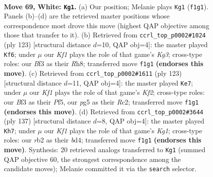 \documentclass[11pt]{article}
\begin{document}
\clearpage

\begin{figure}[p]\centering
\begin{subfigure}{0.46\textwidth}\centering
\resizebox{\linewidth}{!}{%
\newchessgame
\chessboard[
  setfen={8/8/4k3/4p1p1/5p2/5B2/1r6/5K2 w - - 49 69},
  showmover=false,
  pgfstyle=straightmove, color=movearrow, markmove={f1-g1}
]}
\caption{}
\end{subfigure}\hfill
\begin{subfigure}{0.46\textwidth}\centering
\resizebox{\linewidth}{!}{%
\newchessgame
\chessboard[
  setfen={7r/3R4/6k1/8/5p2/5P2/6P1/6K1 b - - 8 62},
  showmover=false,
  pgfstyle=straightmove, color=movearrow, markmove={g6-f6}
]}
\caption{}
\end{subfigure}
\\[4pt]
\begin{subfigure}{0.46\textwidth}\centering
\resizebox{\linewidth}{!}{%
\newchessgame
\chessboard[
  setfen={8/5k2/1R6/5p2/5P2/6PK/2r5/8 b - - 0 62},
  showmover=false,
  pgfstyle=straightmove, color=movearrow, markmove={f7-e7}
]}
\caption{}
\end{subfigure}\hfill
\begin{subfigure}{0.46\textwidth}\centering
\resizebox{\linewidth}{!}{%
\newchessgame
\chessboard[
  setfen={6k1/8/8/7P/3B2P1/6K1/2b5/8 b - - 8 69},
  showmover=false,
  pgfstyle=straightmove, color=movearrow, markmove={g8-h7}
]}
\caption{}
\end{subfigure}
\caption{\textbf{Move 69, White: \texttt{Kg1}.} (a) Our position; Melanie plays \texttt{Kg1} (\texttt{f1g1}). Panels (b)--(d) are the retrieved master positions whose correspondence most drove this move (highest QAP objective among those that transfer to it). (b) Retrieved from \texttt{ccrl\_top\_p0002\#1024} (ply 123) [structural distance $d$=10, QAP obj=4]: the master played \texttt{Kf6}; under $\mu$ our \emph{Kf1} plays the role of that game's \emph{Kg3}; cross-type roles: our \emph{B}f3 as their \emph{R}h8; transferred move \texttt{f1g1} \textbf{(endorses this move)}. (c) Retrieved from \texttt{ccrl\_top\_p0002\#1611} (ply 123) [structural distance $d$=11, QAP obj=4]: the master played \texttt{Ke7}; under $\mu$ our \emph{Kf1} plays the role of that game's \emph{Kf2}; cross-type roles: our \emph{B}f3 as their \emph{P}f5, our \emph{p}g5 as their \emph{R}c2; transferred move \texttt{f1g1} \textbf{(endorses this move)}. (d) Retrieved from \texttt{ccrl\_top\_p0002\#3644} (ply 137) [structural distance $d$=8, QAP obj=4]: the master played \texttt{Kh7}; under $\mu$ our \emph{Kf1} plays the role of that game's \emph{Kg1}; cross-type roles: our \emph{r}b2 as their \emph{b}d4; transferred move \texttt{f1g1} \textbf{(endorses this move)}. Synthesis: 20 retrieved analogs transferred to \texttt{Kg1} (summed QAP objective 60, the strongest correspondence among the candidate moves); Melanie committed it via the \texttt{search} selector.}
\label{fig:thought-m136}
\end{figure}
\end{document}
